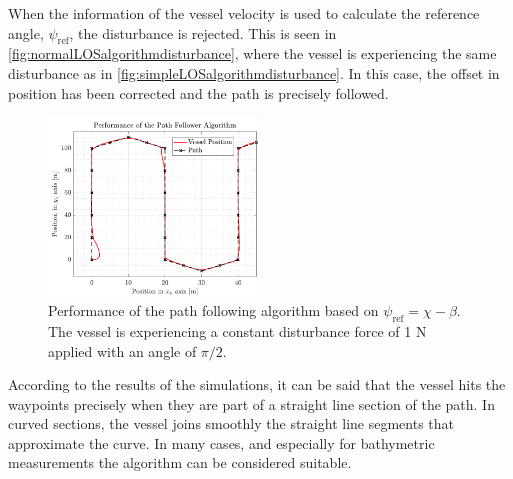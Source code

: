 When the information of the vessel velocity is used to calculate the reference angle, $\psi_\mathrm{ref}$, the disturbance is rejected. This is seen in \autoref{fig:normalLOSalgorithmdisturbance}, where the vessel is experiencing the same disturbance as in \autoref{fig:simpleLOSalgorithmdisturbance}. In this case, the offset in position has been corrected and the path is precisely followed.
\begin{figure}[H]
	\includegraphics[width=0.5\textwidth]{figures/pathfollowingcomplex}
	\caption{Performance of the path following algorithm based on $\psi_\mathrm{ref}=\chi-\beta$. The vessel is experiencing a constant disturbance force of 1 N applied with an angle of $\pi/2$.}
	\label{fig:normalLOSalgorithmdisturbance}
\end{figure}
According to the results of the simulations, it can be said that the vessel hits the waypoints precisely when they are part of a straight line section of the path. In curved sections, the vessel joins smoothly the straight line segments that approximate the curve. In many cases, and especially for bathymetric measurements the algorithm can be considered suitable.

	



